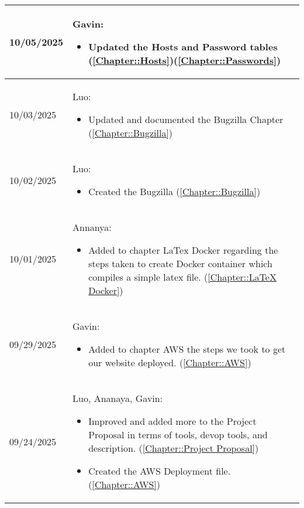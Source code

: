 \begin{longtable}{|l||p{13.5cm}|}
10/05/2025 & Gavin:
\begin{itemize}[topsep=0pt,itemsep=0pt,parsep=0pt,partopsep=0pt,leftmargin=12pt]
\item Updated the Hosts and Password tables (\ref{Chapter::Hosts})(\ref{Chapter::Passwords})
\end{itemize} 
\\ \hline

10/03/2025 & Luo:
\begin{itemize}[topsep=0pt,itemsep=0pt,parsep=0pt,partopsep=0pt,leftmargin=12pt]
\item Updated and documented the Bugzilla Chapter (\ref{Chapter::Bugzilla})
\end{itemize} 
\\ \hline

10/02/2025 & Luo:
\begin{itemize}[topsep=0pt,itemsep=0pt,parsep=0pt,partopsep=0pt,leftmargin=12pt]
\item Created the Bugzilla (\ref{Chapter::Bugzilla})
\end{itemize} 
\\ \hline

10/01/2025 & Annanya:
\begin{itemize}[topsep=0pt,itemsep=0pt,parsep=0pt,partopsep=0pt,leftmargin=12pt]
\item Added to chapter LaTex Docker regarding the steps taken to create Docker container which compiles a simple latex file. (\ref{Chapter::LaTeX Docker})
\end{itemize} 
\\ \hline

09/29/2025 & Gavin:
\begin{itemize}[topsep=0pt,itemsep=0pt,parsep=0pt,partopsep=0pt,leftmargin=12pt]
\item Added to chapter AWS the steps we took to get our website deployed. (\ref{Chapter::AWS})
\end{itemize} 
\\ \hline

09/24/2025 & Luo, Ananaya, Gavin:
\begin{itemize}[topsep=0pt,itemsep=0pt,parsep=0pt,partopsep=0pt,leftmargin=12pt]
\item Improved and added more to the Project Proposal in terms of tools, devop tools, and description. (\ref{Chapter::Project Proposal})
\item Created the AWS Deployment file. (\ref{Chapter::AWS})
\end{itemize} 
\\ \hline


\end{longtable}
